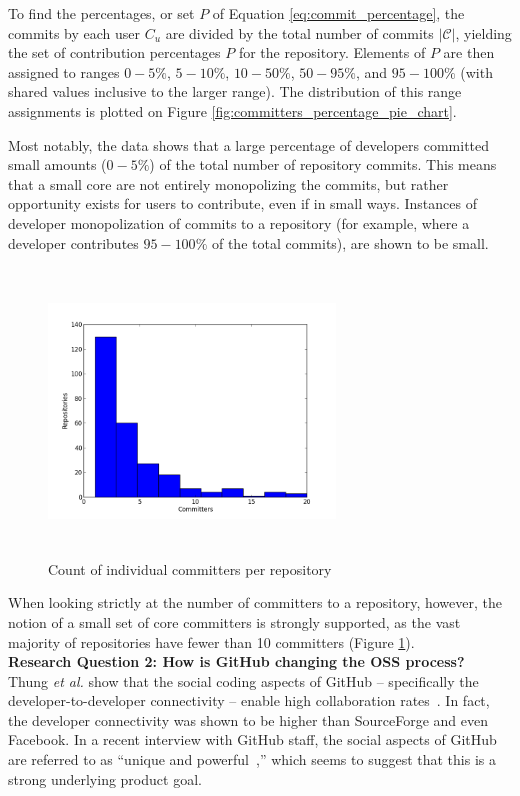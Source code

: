 \documentclass{proc}
\begin{document}
{{{{{To find the percentages, or set $P$ of Equation \ref{eq:commit_percentage}, the commits by each user $C_u$ are divided by the total number of commits $|\mathscr{C}|$, yielding the set of contribution percentages $P$ for the repository. Elements of $P$ are then assigned to ranges $0-5\%$, $5-10\%$, $10-50\%$, $50-95\%$, and $95-100\%$ (with shared values inclusive to the larger range). The distribution of this range assignments is plotted on Figure \ref{fig:committers_percentage_pie_chart}.

Most notably, the data shows that a large percentage of developers committed small amounts ($0-5\%$) of the total number of repository commits. This means that a small core are not entirely monopolizing the commits, but rather opportunity exists for users to contribute, even if in small ways. Instances of developer monopolization of commits to a repository (for example, where a developer contributes $95-100\%$ of the total commits), are shown to be small.

\begin{figure}
\includegraphics[height=3in,width=3in]{images/committers_histogram.png}
\caption{Count of individual committers per repository}
\label{fig:committers_histogram}
\end{figure}

When looking strictly at the number of committers to a repository, however, the notion of a small set of core committers is strongly supported, as the vast majority of repositories have fewer than 10 committers (Figure \ref{fig:committers_histogram}).\\

\noindent \textbf{Research Question 2: How is GitHub changing the OSS process?}\\
Thung \textit{et al.} show that the social coding aspects of GitHub -- specifically the developer-to-developer connectivity -- enable high collaboration rates~\cite{thung2013network}. In fact, the developer connectivity was shown to be higher than SourceForge and even Facebook. In a recent interview with GitHub staff, the social aspects of GitHub are referred to as ``unique and powerful~\cite{begel2013social},'' which seems to suggest that this is a strong underlying product goal.

}}}}}
\end{document}
